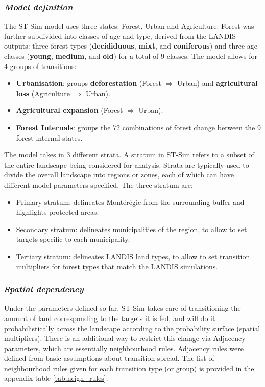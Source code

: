 \subsubsection*{\textit{Model definition}}

The ST-Sim model uses three states: Forest, Urban and Agriculture. Forest was further subdivided into classes of age and type, derived from the LANDIS outputs: three forest types (\textbf{decididuous}, \textbf{mixt}, and \textbf{coniferous}) and three age classes (\textbf{young}, \textbf{medium}, and \textbf{old}) for a total of 9 classes.
The model allows for 4 groups of transitions:
\begin{itemize}
\item{\textbf{Urbanisation}}: groups \textbf{deforestation} (Forest $\Rightarrow$ Urban) and \textbf{agricultural loss} (Agriculture $\Rightarrow$ Urban).
\item{\textbf{Agricultural expansion}} (Forest $\Rightarrow$ Urban).
\item{\textbf{Forest Internals}}: groups the 72 combinations of forest change between the 9 forest internal states.
\end{itemize}
The model takes in 3 different strata. A stratum in ST-Sim refers to a subset of the entire landscape being considered for analysis. Strata are typically used to divide the overall landscape into regions or zones, each of which can have different model parameters specified. The three stratum are:
\begin{itemize}
\item{Primary stratum:} delineates Montérégie from the  surrounding buffer and highlights protected areas.
\item{Secondary stratum:} delineates municipalities of the region, to allow to set targets specific to each municipality. 
\item{Tertiary stratum:} delineates LANDIS land types, to allow to set transition multipliers for forest types that match the LANDIS simulations. \\
\end{itemize}

\subsubsection*{\textit{Spatial dependency}}

Under the parameters defined so far, ST-Sim takes care of transitioning the amount of land corresponding to the targets it is fed, and will do it probabilistically across the landscape according to the probability surface (spatial multipliers). There is an additional way to restrict this change via Adjacency parameters, which are essentially neighbourhood rules. Adjacency rules were defined from basic assumptions about transition spread. The list of neighbourhood rules given for each transition type (or group) is provided in the appendix table \ref{tab:neigh_rules}.


